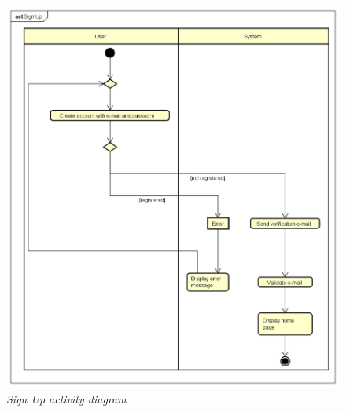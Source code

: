 \documentclass[table, 12pt]{article}
\begin{document}
\begin{figure}[!h]
    \centering
    \includegraphics[scale=0.45]{assets/Activity-Diagrams/act_sign.png}
    \caption{\textit{Sign Up activity diagram}}
\end{figure}
\newpage
\end{document}
